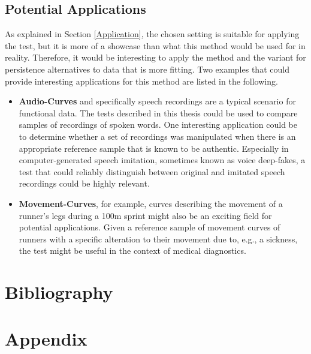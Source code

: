 \documentclass[12pt, a4paper]{article}
\theoremstyle{MAstyle} \newtheorem{assumption}{Assumption}[section]
\theoremstyle{MAstyle} \newtheorem{definition}{Definition}[section]
\theoremstyle{MAstyle} \newtheorem{theorem}{Theorem}[section]
\begin{document}
		\subsection{Potential Applications}\label{pot_appl}
			As explained in Section \ref{Application}, the chosen setting is suitable for applying the test, but it is more of a showcase than what this method would be used for in reality. Therefore, it would be interesting to apply the method and the variant for persistence alternatives to data that is more fitting. Two examples that could provide interesting applications for this method are listed in the following.
			\begin{itemize}
				\item \textbf{Audio-Curves} and specifically speech recordings are a typical scenario for functional data. The tests described in this thesis could be used to compare samples of recordings of spoken words. One interesting application could be to determine whether a set of recordings was manipulated when there is an appropriate reference sample that is known to be authentic. Especially in computer-generated speech imitation, sometimes known as voice deep-fakes, a test that could reliably distinguish between original and imitated speech recordings could be highly relevant.
				\item \textbf{Movement-Curves}, for example, curves describing the movement of a runner's legs during a 100m sprint might also be an exciting field for potential applications. Given a reference sample of movement curves of runners with a specific alteration to their movement due to, e.g., a sickness, the test might be useful in the context of medical diagnostics.
			\end{itemize}
		
		
	
	\newpage
	\section{Bibliography}
	\printbibliography[heading=none]
	
	\newpage
	\cleardoublepage
	\setcounter{page}{1}
	\section{Appendix}
	
\end{document}

